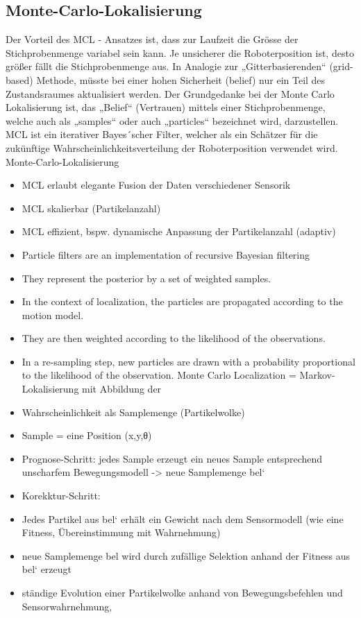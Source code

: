 \documentclass{article}
\begin{document}
\subsection{Monte-Carlo-Lokalisierung}
Der Vorteil des MCL - Ansatzes ist, dass zur Laufzeit die Gr\"osse der
Stichprobenmenge variabel sein kann. Je unsicherer die Roboterposition ist,
desto größer fällt die Stichprobenmenge aus. In Analogie zur
„Gitterbasierenden“ (grid-based) Methode, m\"usste bei einer hohen Sicherheit
(belief) nur ein Teil des Zustandsraumes aktualisiert werden.\cite{delipetkos1}
Der Grundgedanke bei der Monte Carlo Lokalisierung ist, das „Belief“
(Vertrauen) mittels einer Stichprobenmenge, welche auch als „samples“ oder
auch „particles“ bezeichnet wird, darzustellen. MCL ist ein iterativer Bayes´scher
Filter, welcher als ein Schätzer f\"ur die zuk\"unftige Wahrscheinlichkeitsverteilung
der Roboterposition verwendet wird.
Monte-Carlo-Lokalisierung
\begin{itemize}
\item MCL erlaubt elegante Fusion der Daten verschiedener Sensorik
\item MCL skalierbar (Partikelanzahl)
\item MCL effizient, bspw. dynamische Anpassung der Partikelanzahl (adaptiv)

\item Particle filters are an implementation of recursive Bayesian filtering
\item They represent the posterior by a set of weighted samples.
\item In the context of localization, the particles are propagated according to the motion model.
\item They are then weighted according to the likelihood of the observations.
\item In a re-sampling step, new particles are drawn with a probability proportional to the likelihood of the observation.
Monte Carlo Localization = Markov-Lokalisierung mit Abbildung der
\item Wahrscheinlichkeit als Samplemenge (Partikelwolke)
\item Sample = eine Position (x,y,θ)
\item Prognose-Schritt: jedes Sample erzeugt ein neues Sample entsprechend
unscharfem Bewegungsmodell -> neue Samplemenge bel‘
\item Korekktur-Schritt:
\item  Jedes Partikel aus bel‘ erhält ein Gewicht nach dem Sensormodell (wie eine
Fitness, Übereinstimmung mit Wahrnehmung)
\item  neue Samplemenge bel wird durch zufällige Selektion anhand der Fitness aus
bel‘ erzeugt
\item  ständige Evolution einer Partikelwolke anhand von Bewegungsbefehlen und
Sensorwahrnehmung,
\end{itemize}
\end{document}
